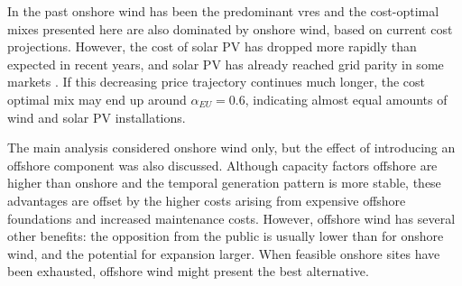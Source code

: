 \documentclass[a4paper, 5p, sort&compress]{elsarticle}%
\begin{document}
In the past onshore wind has been the predominant \gls{vres} and the
cost-optimal mixes presented here are also dominated by onshore wind,
based on current cost projections.  However, the cost of solar PV has
dropped more rapidly than expected in recent years, and solar PV has
already reached grid parity in some markets \cite{solarGridParity}. If
this decreasing price trajectory continues much longer, the cost
optimal mix may end up around $\alpha_{EU} = 0.6$,
indicating almost equal amounts of wind and solar PV installations.




The main analysis considered onshore wind only, but the effect of
introducing an offshore component was also discussed. Although
capacity factors offshore are higher than onshore and the temporal
generation pattern is more stable, these advantages are offset by the
higher costs arising from expensive offshore foundations and increased
maintenance costs. However, offshore wind has several other benefits:
the opposition from the public is usually lower than for onshore wind,
and the potential for expansion larger. When feasible onshore sites
have been exhausted, offshore wind might present the best alternative.
\end{document}

